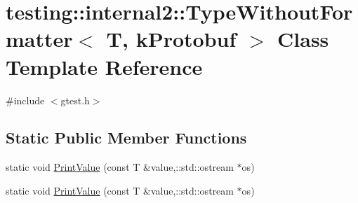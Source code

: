\hypertarget{classtesting_1_1internal2_1_1_type_without_formatter_3_01_t_00_01k_protobuf_01_4}{\section{testing\-:\-:internal2\-:\-:Type\-Without\-Formatter$<$ T, k\-Protobuf $>$ Class Template Reference}
\label{classtesting_1_1internal2_1_1_type_without_formatter_3_01_t_00_01k_protobuf_01_4}
}


{\ttfamily \#include $<$gtest.\-h$>$}

\subsection*{Static Public Member Functions}
\begin{DoxyCompactItemize}
\item 
static void \hyperlink{classtesting_1_1internal2_1_1_type_without_formatter_3_01_t_00_01k_protobuf_01_4_a714da93952c590db954228bd9cc60abf}{Print\-Value} (const T \&value,\-::std\-::ostream $\ast$os)
\item 
static void \hyperlink{classtesting_1_1internal2_1_1_type_without_formatter_3_01_t_00_01k_protobuf_01_4_a714da93952c590db954228bd9cc60abf}{Print\-Value} (const T \&value,\-::std\-::ostream $\ast$os)
\end{DoxyCompactItemize}


